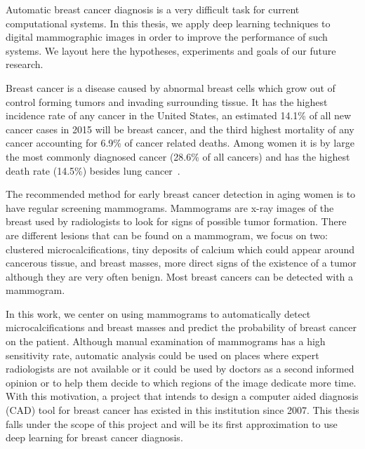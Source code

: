 \begin{comment} 
Hook(first paragarpah) : Automatic breast cancer diagnosis is a very difficult taks for current automatic computationnal systems. In this article,  we apply deep learning techniques to digital mammogrpahic images and obtain better results than presented to date. We show or prove or use this technique to obtain this... (when we have results)
\end{comment}
Automatic breast cancer diagnosis is a very difficult task for current computational systems. In this thesis, we apply deep learning techniques to digital mammographic images in order to improve the performance of such systems. We layout here the hypotheses, experiments and goals of our future research.

Breast cancer is a disease caused by abnormal breast cells which grow out of control forming tumors and invading surrounding tissue.
It has the highest incidence rate of any cancer in the United States, an estimated 14.1\% of all new cancer cases in 2015 will be breast cancer, and the third highest mortality of any cancer accounting for 6.9\% of cancer related deaths. Among women it is by large the most commonly diagnosed cancer (28.6\% of all cancers) and has the highest death rate (14.5\%) besides lung cancer~\cite{ACS2015}.

The recommended method for early breast cancer detection in aging women is to have regular screening mammograms. Mammograms are x-ray images of the breast used by radiologists to look for signs of possible tumor formation. There are different lesions that can be found on a mammogram, we focus on two: clustered microcalcifications, tiny deposits of calcium which could appear around cancerous tissue, and breast masses, more direct signs of the existence of a tumor although they are very often benign. Most breast cancers can be detected with a mammogram.%

In this work, we center on using mammograms to automatically detect microcalcifications and breast masses and predict the probability of breast cancer on the patient. Although manual examination of mammograms has a high sensitivity rate, automatic analysis could be used on places where expert radiologists are not available or it could be used by doctors as a second informed opinion or to help them decide to which regions of the image dedicate more time. With this motivation, a project that intends to design a computer aided diagnosis (CAD) tool for breast cancer has existed in this institution since 2007. This thesis falls under the scope of this project and will be its first approximation to use deep learning for breast cancer diagnosis.

